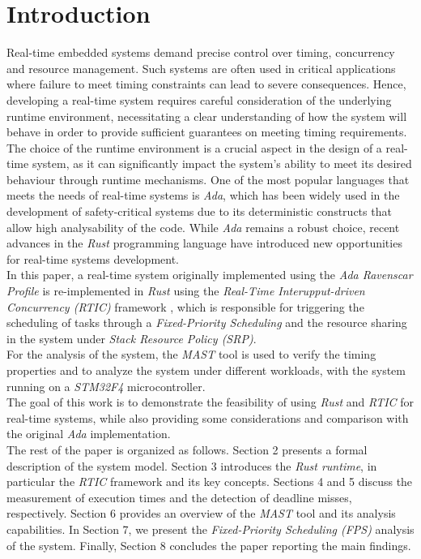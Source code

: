 \section{Introduction}
Real-time embedded systems demand precise control over timing, concurrency and
resource management.  
Such systems are often used in critical applications where failure to meet
timing constraints can lead to severe consequences. Hence, developing a
real-time system requires careful consideration of the underlying runtime
environment, necessitating a clear understanding of how the system will behave
in order to provide sufficient guarantees on meeting timing requirements. \\
The choice of the runtime environment is a crucial aspect in the design of a
real-time system, as it can significantly impact the system's ability to meet
its desired behaviour through runtime mechanisms. One of the most
popular languages that meets the needs of real-time systems is \textit{Ada},
which has been widely used in the development of safety-critical systems due to
its deterministic constructs that allow high analysability of the code. While
\textit{Ada} remains a robust choice, recent advances in the \textit{Rust}
programming language have introduced new opportunities for real-time systems
development. \\ 
In this paper, a real-time system originally implemented using the \textit{Ada
Ravenscar Profile} is re-implemented in \textit{Rust} using the
\textit{Real-Time Interupput-driven Concurrency (RTIC)} framework \cite{RTIC},
which is responsible for triggering the scheduling of tasks through a
\textit{Fixed-Priority Scheduling} and the resource sharing in the system under
\textit{Stack Resource Policy (SRP)}. \\ 
For the analysis of the system, the \textit{MAST} tool
\cite{MASTComprehensiveTool} is used to verify the timing properties and to
analyze the system under different workloads, with the system running on a
\textit{STM32F4} microcontroller. \\  
The goal of this work is to demonstrate the feasibility of using \textit{Rust}
and \textit{RTIC} for real-time systems, while also providing some
considerations and comparison with the original \textit{Ada} implementation. \\ 
The rest of the paper is organized as follows. Section 2 presents a formal
description of the system model. Section 3 introduces the \textit{Rust runtime},
in particular the \textit{RTIC} framework and its key concepts. Sections 4 and 5
discuss the measurement of execution times and the detection of deadline misses,
respectively. Section 6 provides an overview of the \textit{MAST} tool and its
analysis capabilities. In Section 7, we present the \textit{Fixed-Priority
Scheduling (FPS)} analysis of the system. Finally, Section 8 concludes the paper
reporting the main findings.  